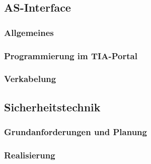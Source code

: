 \subsection{AS-Interface}

\subsubsection{Allgemeines}

\subsubsection{Programmierung im TIA-Portal}

\subsubsection{Verkabelung}


\subsection{Sicherheitstechnik}
\subsubsection{Grundanforderungen und Planung}
\subsubsection{Realisierung}